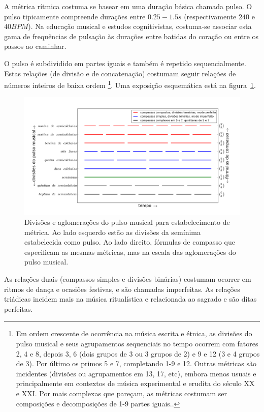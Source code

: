 A métrica rítmica costuma se basear em uma duração básica chamada pulso. O pulso tipicamente
compreende durações entre $0.25-1.5s$ (respectivamente $240$ e $40BPM$). Na educação musical e estudos cognitivistas,
costuma-se associar esta gama de frequências de pulsação às durações entre batidas 
do coração ou entre os passos ao caminhar.\cite{Lacerda,Roederer}

O pulso é subdividido em partes iguais e também é 
repetido sequencialmente. Estas relações (de divisão e de concatenação) costumam
seguir relações de números inteiros de baixa ordem
\footnote{Em ordem crescente de ocorrência na música
escrita e étnica,
as divisões do pulso musical e seus agrupamentos
sequenciais no tempo ocorrem com fatores 2, 4 e 8, depois 3, 6 (dois grupos de 3 ou 3 grupos de 2) e 9 e 12 (3 e 4 grupos de 3). Por 
último os primos 5 e 7, completando 1-9 e 12.
Outras métricas são incidentes (divisões ou agrupamentos em 13, 17, etc), embora menos usuais e principalmente em contextos de música experimental e erudita do século XX e XXI. Por mais complexas que pareçam, as métricas costumam ser composições e decomposições de 1-9 partes iguais.\cite{Gramani,Roederer}.}.
Uma exposição esquemática está na figura~\ref{fig:pulsoSubAgl}.

\begin{figure}[h!]
    \centering
        \includegraphics[width=\textwidth]{figuras/metricaMusical}
    \caption{Divisões e aglomerações do pulso musical para estabelecimento de métrica. Ao lado esquerdo estão as divisões da semínima estabelecida como pulso. Ao lado direito, fórmulas de compasso que especificam as mesmas métricas, mas na escala das aglomerações do pulso musical.}
        \label{fig:pulsoSubAgl}
\end{figure}

As relações duais (compassos simples e divisões binárias) costumam ocorrer em ritmos de dança
e ocasiões festivas, e são chamadas imperfeitas. As relações triádicas
incidem mais na música ritualística e relacionada ao sagrado
e são ditas perfeitas.

